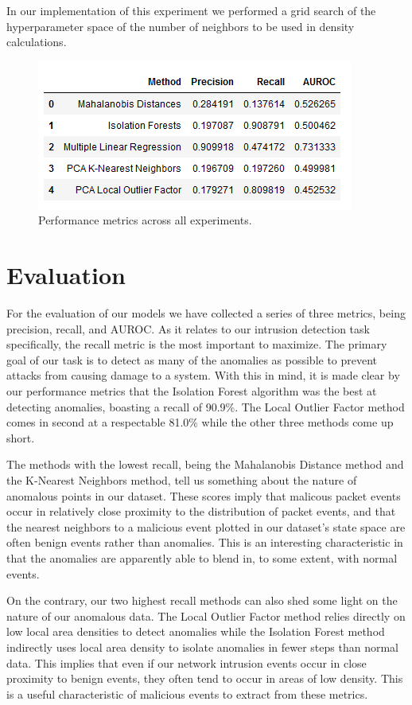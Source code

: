 \documentclass[conference]{IEEEtran}
\begin{document}
In our implementation of this experiment we performed a grid search of the hyperparameter space of the number of neighbors to be used in density calculations.

\begin{figure}[htbp]
\centerline{\includegraphics{results.png}}
\caption{Performance metrics across all experiments.}
\label{fig}
\end{figure}

\section{Evaluation}

For the evaluation of our models we have collected a series of three metrics, being precision, recall, and AUROC. As it relates to our intrusion detection task specifically, the recall metric is the most important to maximize. The primary goal of our task is to detect as many of the anomalies as possible to prevent attacks from causing damage to a system. With this in mind, it is made clear by our performance metrics that the Isolation Forest algorithm was the best at detecting anomalies, boasting a recall of 90.9\%. The Local Outlier Factor method comes in second at a respectable 81.0\% while the other three methods come up short.

The methods with the lowest recall, being the Mahalanobis Distance method and the K-Nearest Neighbors method, tell us something about the nature of anomalous points in our dataset. These scores imply that malicous packet events occur in relatively close proximity to the distribution of packet events, and that the nearest neighbors to a malicious event plotted in our dataset's state space are often benign events rather than anomalies. This is an interesting characteristic in that the anomalies are apparently able to blend in, to some extent, with normal events.

On the contrary, our two highest recall methods can also shed some light on the nature of our anomalous data. The Local Outlier Factor method relies directly on low local area densities to detect anomalies while the Isolation Forest method indirectly uses local area density to isolate anomalies in fewer steps than normal data. This implies that even if our network intrusion events occur in close proximity to benign events, they often tend to occur in areas of low density. This is a useful characteristic of malicious events to extract from these metrics.
\end{document}
